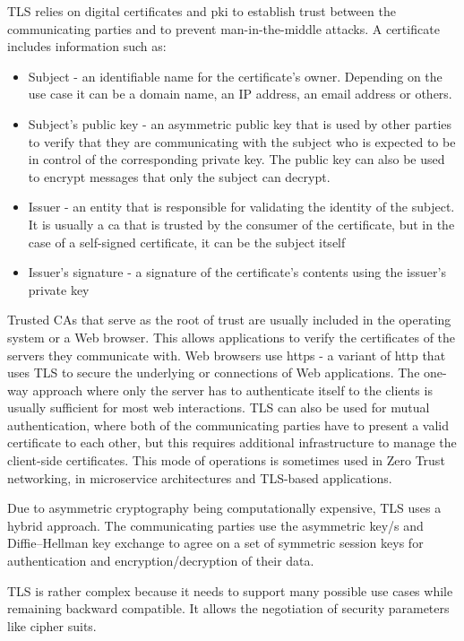 TLS relies on digital certificates and \gls{pki} to establish trust between the communicating parties and to prevent man-in-the-middle attacks. A certificate includes information such as:

\begin{itemize}
\tightlist
\item
  Subject - an identifiable name for the certificate's owner. Depending on the use case it can be a domain name, an IP address, an email address or others.
\item
  Subject's public key - an asymmetric public key that is used by other parties to verify that they are communicating with the subject who is expected to be in control of the corresponding private key. The public key can also be used to encrypt messages that only the subject can decrypt.
\item
  Issuer - an entity that is responsible for validating the identity of the subject. It is usually a \gls{ca} that is trusted by the consumer of the certificate, but in the case of a self-signed certificate, it can be the subject itself
\item
  Issuer's signature - a signature of the certificate's contents using the issuer's private key
\end{itemize}

Trusted CAs that serve as the root of trust are usually included in the operating system or a Web browser. This allows applications to verify the certificates of the servers they communicate with. Web browsers use \gls{https} \autocite{httpsRFC} - a variant of \gls{http} that uses TLS to secure the underlying  or  connections of Web applications. The one-way approach where only the server has to authenticate itself to the clients is usually sufficient for most web interactions. TLS can also be used for mutual authentication, where both of the communicating parties have to present a valid certificate to each other, but this requires additional infrastructure to manage the client-side certificates. This mode of operations is sometimes used in Zero Trust networking, in microservice architectures and TLS-based  applications.

Due to asymmetric cryptography being computationally expensive, TLS uses a hybrid approach. The communicating parties use the asymmetric key/s and Diffie--Hellman key exchange to agree on a set of symmetric session keys for authentication and encryption/decryption of their data.

TLS is rather complex because it needs to support many possible use cases while remaining backward compatible. It allows the negotiation of security parameters like cipher suits.

